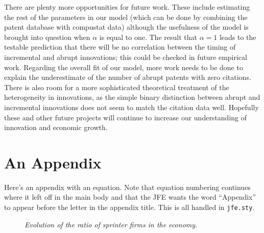 \documentclass[letterpaper,12pt]{article}
\theoremstyle{definition}
\begin{document}
There are plenty more opportunities for future work. These include estimating the rest of the parameters in our model (which can be done by combining the patent database with compustat data) although the usefulness of the model is brought into question when $\alpha$ is equal to one. The result that $\alpha = 1$ leads to the testable prediction that there will be no correlation between the timing of  incremental and abrupt innovations; this could be checked in future empirical work. Regarding the overall fit of our model, more work needs to be done to explain the underestimate of the number of abrupt patents with zero citations. There is also room for a more sophisticated theoretical treatment of the heterogeneity in innovations, as the simple binary distinction between abrupt and incremental innovations does not seem to match the citation data well. Hopefully these and other future projects will continue to increase our understanding of innovation and economic growth.



\nocite{*}


\clearpage

\appendix

\section{An Appendix}
\label{sec:app1}

Here's an appendix with an equation. Note that equation numbering continues where it left off in the main body and that the JFE wants the word ``Appendix'' to appear before the letter in the appendix title. This is all handled in \texttt{jfe.sty}.

\begin{figure}[htb]\centering \captionsetup{width=5.8in}
    \caption{\label{fig:CBFirms}\textit{Evolution of the ratio of sprinter firms in the economy.}}
\end{figure}
\end{document}
